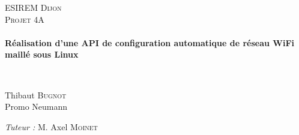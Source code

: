\begin{titlepage}
  \begin{sffamily}
  \begin{center}
    \textsc{\LARGE ESIREM Dijon}\\[2cm]

    \textsc{\Large Projet 4A}\\[1.5cm]

    \HRule \\[0.4cm]
    { \huge \bfseries Réalisation d'une API de configuration automatique de réseau WiFi maillé sous Linux\\[0.4cm] }

    \HRule \\[2cm]
    

    \begin{minipage}{0.4\textwidth}
      \begin{flushleft} \large
        Thibaut \textsc{Bugnot}\\
        Promo Neumann\\
      \end{flushleft}
    \end{minipage}
    \begin{minipage}{0.4\textwidth}
      \begin{flushright} \large
        \emph{Tuteur :} M. Axel \textsc{Moinet}\\
      \end{flushright}
    \end{minipage}

  \end{center}
  \end{sffamily}
\end{titlepage}